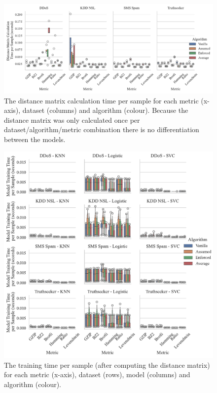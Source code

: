 \documentclass[preprint,12pt]{elsarticle}
\begin{document}
\begin{figure}
    \includegraphics[width=\textwidth]{images/distance_matrix_time_vs_algorithm.pdf}
    \caption{The distance matrix calculation time per sample for each metric (x-axis), dataset (columns) and algorithm (colour). Because the distance matrix was only calculated once per dataset/algorithm/metric combination there is no differentiation between the models.}
    \label{fig:distance_time}
\end{figure}

\begin{figure}
    \includegraphics[width=\textwidth]{images/train_time_vs_algorithm.pdf}
    \caption{The training time  per sample (after computing the distance matrix) for each metric (x-axis), dataset (rows), model (columns) and algorithm (colour).}
    \label{fig:train_time}
\end{figure}
\end{document}
